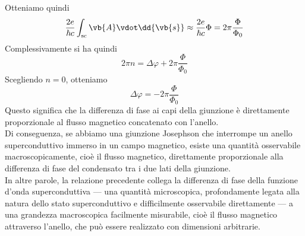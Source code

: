Otteniamo quindi
\begin{equation*}
    \frac{2e}{\hbar c}
    \int_{\text{sc}}
    \vb{A}\vdot\dd{\vb{s}}
    \approx
    \frac{2e}{\hbar c}\Phi
    =
    2\pi\frac{\Phi}{\Phi_0}
\end{equation*}
Complessivamente si ha quindi
\begin{equation*}
    2\pi n
    =
    \Delta\varphi
    +
    2\pi\frac{\Phi}{\Phi_0}
\end{equation*}
Scegliendo $n=0$, otteniamo
\begin{equation*}
    \Delta\varphi=-2\pi\frac{\Phi}{\Phi_0}
\end{equation*}
Questo significa che la differenza di fase ai capi della giunzione è direttamente proporzionale al flusso magnetico concatenato con l'anello.\\
Di conseguenza, se abbiamo una giunzione Josephson che interrompe un anello superconduttivo immerso in un campo magnetico, esiste una quantità osservabile macroscopicamente, cioè il flusso magnetico, direttamente proporzionale alla differenza di fase del condensato tra i due lati della giunzione.\\
In altre parole, la relazione precedente collega la differenza di fase della funzione d'onda superconduttiva — una quantità microscopica, profondamente legata alla natura dello stato superconduttivo e difficilmente osservabile direttamente — a una grandezza macroscopica facilmente misurabile, cioè il flusso magnetico attraverso l'anello, che può essere realizzato con dimensioni arbitrarie.
